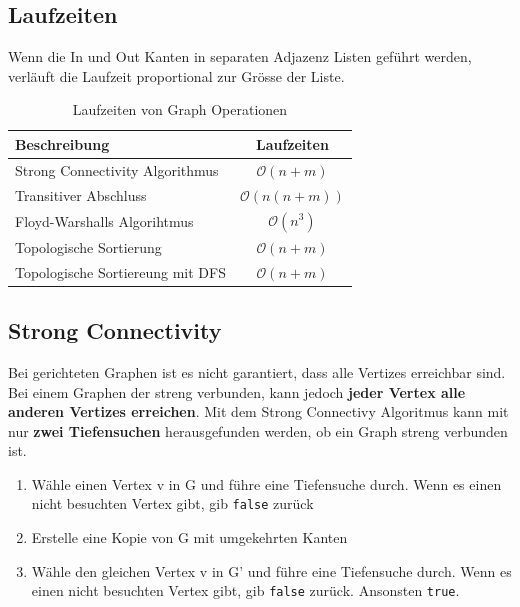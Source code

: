 \subsection{Laufzeiten}
Wenn die In und Out Kanten in separaten Adjazenz Listen geführt werden, verläuft die Laufzeit proportional zur Grösse der Liste.

\begin{table}[h]
	\centering
	\begin{tabu} to \linewidth {l c}
		\toprule
		Beschreibung & Laufzeiten \\
		\midrule
		Strong Connectivity Algorithmus & $\mathcal{O}(n+m)$ \\
		Transitiver Abschluss & $\mathcal{O}(n(n+m))$ \\
		Floyd-Warshalls Algorihtmus & $\mathcal{O}(n^3)$ \\
		Topologische Sortierung & $\mathcal{O}(n+m)$ \\
		Topologische Sortiereung mit DFS & $\mathcal{O}(n+m)$ \\
		\bottomrule
	\end{tabu}
	\caption{Laufzeiten von Graph Operationen}
\end{table}


\subsection{Strong Connectivity}
Bei gerichteten Graphen ist es nicht garantiert, dass alle Vertizes erreichbar sind. Bei einem Graphen der streng verbunden, kann jedoch \textbf{jeder Vertex alle anderen Vertizes erreichen}. Mit dem Strong Connectivy Algoritmus kann mit nur \textbf{zwei Tiefensuchen} herausgefunden werden, ob ein Graph streng verbunden ist. 
\begin{enumerate}
	\item Wähle einen Vertex v in G und führe eine Tiefensuche durch. Wenn es einen nicht besuchten Vertex gibt, gib \lstinline|false| zurück
	\item Erstelle eine Kopie von G mit umgekehrten Kanten
	\item Wähle den gleichen Vertex v in G' und führe eine Tiefensuche durch. Wenn es einen nicht besuchten Vertex gibt, gib \lstinline|false| zurück. Ansonsten \lstinline|true|.
\end{enumerate}

\clearpage


